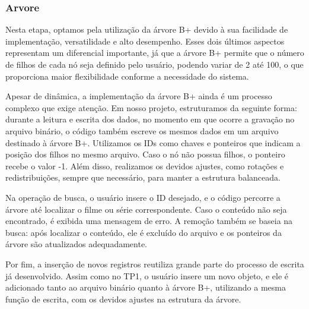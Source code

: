 \documentclass[12pt]{article}
\begin{document}
\subsubsection{Arvore}
Nesta etapa, optamos pela utilização da árvore B+ devido à sua facilidade de implementação, versatilidade e alto desempenho. Esses dois últimos aspectos representam um diferencial importante, já que a árvore B+ permite que o número de filhos de cada nó seja definido pelo usuário, podendo variar de 2 até 100, o que proporciona maior flexibilidade conforme a necessidade do sistema.

Apesar de dinâmica, a implementação da árvore B+ ainda é um processo complexo que exige atenção. Em nosso projeto, estruturamos da seguinte forma: durante a leitura e escrita dos dados, no momento em que ocorre a gravação no arquivo binário, o código também escreve os mesmos dados em um arquivo destinado à árvore B+. Utilizamos os IDs como chaves e ponteiros que indicam a posição dos filhos no mesmo arquivo. Caso o nó não possua filhos, o ponteiro recebe o valor -1. Além disso, realizamos os devidos ajustes, como rotações e redistribuições, sempre que necessário, para manter a estrutura balanceada.

Na operação de busca, o usuário insere o ID desejado, e o código percorre a árvore até localizar o filme ou série correspondente. Caso o conteúdo não seja encontrado, é exibida uma mensagem de erro. A remoção também se baseia na busca: após localizar o conteúdo, ele é excluído do arquivo e os ponteiros da árvore são atualizados adequadamente.

Por fim, a inserção de novos registros reutiliza grande parte do processo de escrita já desenvolvido. Assim como no TP1, o usuário insere um novo objeto, e ele é adicionado tanto ao arquivo binário quanto à árvore B+, utilizando a mesma função de escrita, com os devidos ajustes na estrutura da árvore.
\end{document}
